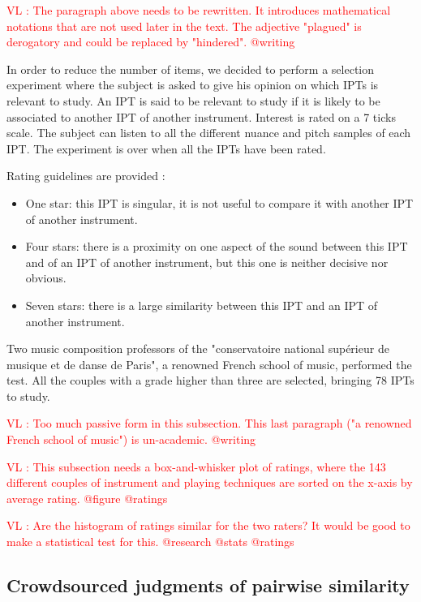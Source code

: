 \documentclass{article}
\newcommand{\ipt}{IPT\xspace}
\newcommand{\ipts}{IPTs\xspace}
\newcommand{\vl}[1]{\textcolor{red}{VL : #1}}
\begin{document}
\vl{The paragraph above needs to be rewritten. It introduces mathematical
notations that are not used later in the text. The adjective "plagued"
is derogatory and could be replaced by "hindered". @writing}

In order to reduce the number of items, we decided to perform a selection
experiment where the subject is asked to give his opinion on which
\ipts is relevant to study. An \ipt is said to be relevant to study
if it is likely to be associated to another \ipt of another instrument.
Interest is rated on a 7 ticks scale. The subject can listen to all the different
nuance and pitch samples of each \ipt. The experiment is over when all the
\ipts have been rated.

Rating guidelines are provided :
\begin{itemize}
  \item One star: this \ipt is singular, it is not useful to compare it with another \ipt of another instrument.
  \item Four stars: there is a proximity on one aspect of the sound between this
  \ipt and of an \ipt of another instrument,
  but this one is neither decisive nor obvious.
  \item Seven stars: there is a large similarity between this \ipt and an \ipt of another instrument.
\end{itemize}

Two music composition professors of the
"conservatoire national sup\'erieur de musique et de danse de Paris",
a renowned French school of music, performed the test.
All the couples with a grade higher than three are selected,
bringing 78 \ipts to study.

\vl{Too much passive form in this subsection. This last paragraph ("a renowned French school of music") is un-academic. @writing}

\vl{This subsection needs a box-and-whisker plot of ratings, where the 143 different
couples of instrument and playing techniques are sorted on the x-axis by average rating. @figure @ratings}

\vl{Are the histogram of ratings similar for the two raters? It would be good to make a statistical test for this. @research @stats @ratings}

\subsection{Crowdsourced judgments of pairwise similarity}
\end{document}
